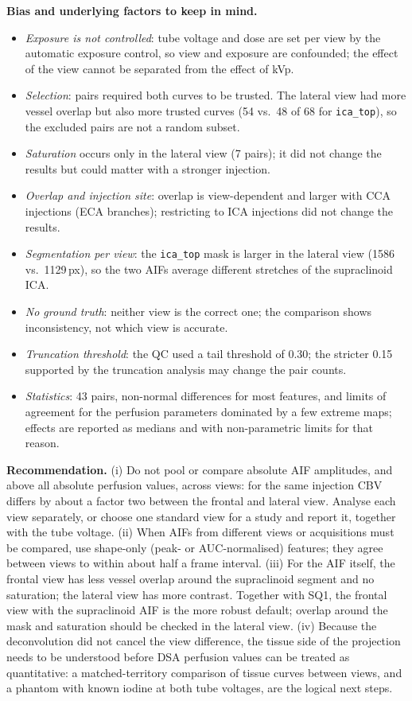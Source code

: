 \textbf{Bias and underlying factors to keep in mind.}
\begin{itemize}
\item \emph{Exposure is not controlled}: tube voltage and dose are set per view by the automatic exposure
control, so view and exposure are confounded; the effect of the view cannot be separated from the effect of kVp.
\item \emph{Selection}: pairs required both curves to be trusted. The lateral view had more vessel overlap but also
more trusted curves (54 vs.\ 48 of 68 for \texttt{ica\_top}), so the excluded pairs are not a random subset.
\item \emph{Saturation} occurs only in the lateral view (7 pairs); it did not change the results but could matter
with a stronger injection.
\item \emph{Overlap and injection site}: overlap is view-dependent and larger with CCA injections (ECA branches);
restricting to ICA injections did not change the results.
\item \emph{Segmentation per view}: the \texttt{ica\_top} mask is larger in the lateral view (1586 vs.\ 1129\,px), so
the two AIFs average different stretches of the supraclinoid ICA.
\item \emph{No ground truth}: neither view is the correct one; the comparison shows inconsistency, not which view
is accurate.
\item \emph{Truncation threshold}: the QC used a tail threshold of 0.30; the stricter 0.15 supported by the
truncation analysis may change the pair counts.
\item \emph{Statistics}: 43 pairs, non-normal differences for most features, and limits of agreement for the
perfusion parameters dominated by a few extreme maps; effects are reported as medians and with non-parametric
limits for that reason.
\end{itemize}

\textbf{Recommendation.}
(i) Do not pool or compare absolute AIF amplitudes, and above all absolute perfusion values, across views: for the
same injection CBV differs by about a factor two between the frontal and lateral view. Analyse each view separately,
or choose one standard view for a study and report it, together with the tube voltage.
(ii) When AIFs from different views or acquisitions must be compared, use shape-only (peak- or AUC-normalised)
features; they agree between views to within about half a frame interval.
(iii) For the AIF itself, the frontal view has less vessel overlap around the supraclinoid segment and no
saturation; the lateral view has more contrast. Together with SQ1, the frontal view with the supraclinoid AIF is the
more robust default; overlap around the mask and saturation should be checked in the lateral view.
(iv) Because the deconvolution did not cancel the view difference, the tissue side of the projection needs to be
understood before DSA perfusion values can be treated as quantitative: a matched-territory comparison of tissue
curves between views, and a phantom with known iodine at both tube voltages, are the logical next steps.
